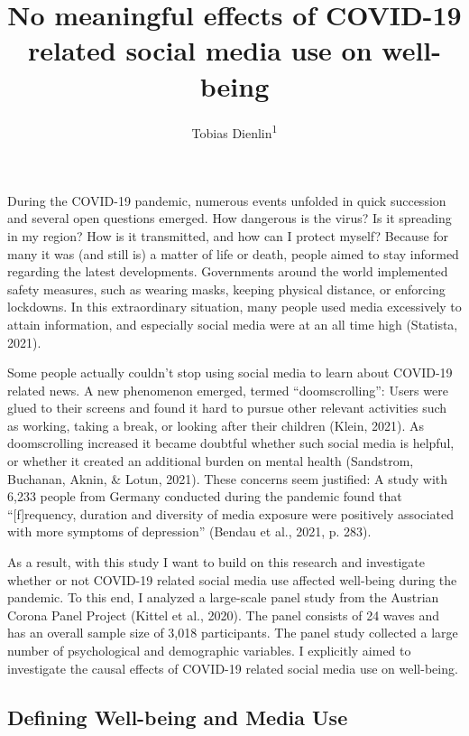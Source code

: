 \documentclass[
  english,
  man,mask,floatsintext]{apa6}
\title{No meaningful effects of COVID-19 related social media use on well-being}
\author{Tobias Dienlin\textsuperscript{1}}
\date{}
\affiliation{\vspace{0.5cm}\textsuperscript{1} University of Vienna}
\begin{document}
\maketitle

During the COVID-19 pandemic,
numerous events unfolded in quick succession and several open questions emerged.
How dangerous is the virus?
Is it spreading in my region?
How is it transmitted, and how can I protect myself?
Because for many it was (and still is) a matter of life or death, people aimed to stay informed regarding the latest developments.
Governments around the world implemented safety measures, such as wearing masks, keeping physical distance, or enforcing lockdowns.
In this extraordinary situation, many people used media excessively to attain information, and especially social media were at an all time high (Statista, 2021).

Some people actually couldn't stop using social media to learn about COVID-19 related news.
A new phenomenon emerged, termed ``doomscrolling'':
Users were glued to their screens and found it hard to pursue other relevant activities such as working, taking a break, or looking after their children (Klein, 2021).
As doomscrolling increased it became doubtful whether such social media is helpful, or whether it created an additional burden on mental health (Sandstrom, Buchanan, Aknin, \& Lotun, 2021).
These concerns seem justified:
A study with 6,233 people from Germany conducted during the pandemic found that ``{[}f{]}requency, duration and diversity of media exposure were positively associated with more symptoms of depression'' (Bendau et al., 2021, p. 283).

As a result, with this study I want to build on this research and investigate whether or not COVID-19 related social media use affected well-being during the pandemic.
To this end, I analyzed a large-scale panel study from the Austrian Corona Panel Project (Kittel et al., 2020).
The panel consists of 24 waves and has an overall sample size of 3,018 participants.
The panel study collected a large number of psychological and demographic variables.
I explicitly aimed to investigate the causal effects of COVID-19 related social media use on well-being.

\hypertarget{defining-well-being-and-media-use}{%
\subsection{Defining Well-being and Media Use}\label{defining-well-being-and-media-use}}
\end{document}
